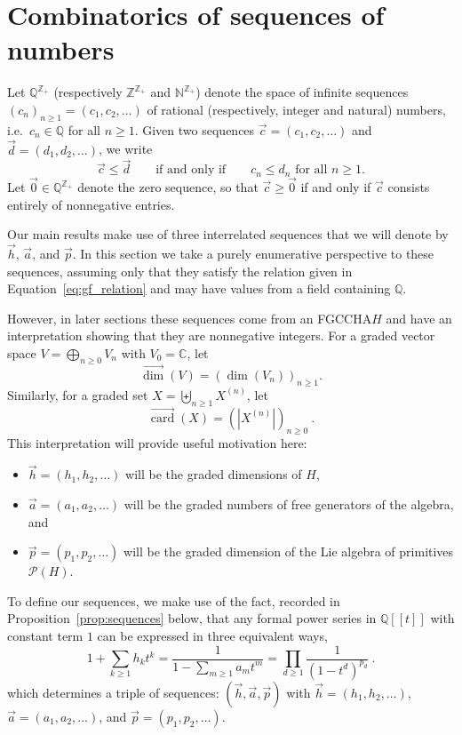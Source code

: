 \documentclass[11pt]{amsart}
\theoremstyle{definition}
\numberwithin{equation}{section}
\def\NN{{\mathbb N}}
\def\CC{{\mathbb C}}
\def\ZZ{{\mathbb Z}}
\def\QQ{{\mathbb Q}}
\newcommand{\FGCCHA}{\textsf{FGCCHA}\xspace}
\newcommand{\vecdim}{\overrightarrow{\dim}}
\newcommand{\veccard}{\overrightarrow{\operatorname{card}}}
\begin{document}
\section{Combinatorics of sequences of numbers}
\label{sec:SequencePrelims}

Let $\QQ^{\ZZ_+}$ (respectively $\ZZ^{\ZZ_+}$ and $\NN^{\ZZ_+}$) denote the space of infinite sequences
$(c_{n})_{n \ge 1} = (c_{1}, c_{2}, \ldots)$ of rational (respectively, integer and natural) numbers,
i.e.~$c_{n} \in \QQ$ for all $n \ge 1$.
Given two sequences $\vec{c} = (c_{1}, c_{2}, \ldots)$ and $\vec{d} = (d_{1}, d_{2}, \ldots)$, we write
\[
\vec{c} \le \vec{d} 
\qquad\text{if and only if}\qquad
\text{$c_{n} \le d_{n}$ for all $n \ge 1$}.
\]
Let $\vec{0} \in \QQ^{\ZZ_+}$ denote the zero sequence, so that $\vec{c} \ge \vec{0}$
if and only if $\vec{c}$ consists entirely of nonnegative entries.

Our main results make use of three interrelated sequences that we will denote by $\vec{h}$, $\vec{a}$, and $\vec{p}$.  
In this section we take a purely enumerative perspective to these sequences, assuming only that they satisfy the relation given in Equation~\eqref{eq:gf_relation} and may have values from a field containing $\QQ$.  

However, in later sections these sequences come from an \FGCCHA $H$
and have an interpretation showing that they are nonnegative integers.
For a graded vector space $V = \bigoplus_{n \ge 0} V_{n}$ with $V_{0} = \CC$, let
\[
\vecdim(V) = \left( \dim(V_{n}) \right)_{n \ge 1}.
\]
Similarly, for a graded set $X = \biguplus_{n \ge 1} X^{(n)}$, let
\[
\veccard(X) = \left( |X^{(n)}| \right)_{n \ge 0}~.
\]
This interpretation will provide useful motivation here:
\begin{itemize}
\item $\vec{h} = (h_{1}, h_{2}, \ldots)$ will be the graded dimensions of $H$,

\item $\vec{a} = (a_{1}, a_{2}, \ldots)$ will be the graded numbers of free generators of the algebra, and 

\item $\vec{p} = (p_{1}, p_{2}, \ldots)$ will be the graded dimension of the Lie algebra of primitives $\mathcal{P}(H)$.

\end{itemize}

To define our sequences, we make use of the fact, recorded in Proposition~\ref{prop:sequences}
below, that any formal power series in $\QQ[\![t]\!]$ with constant term $1$
can be expressed in three equivalent ways,
\begin{equation}
\label{eq:gf_relation}
1 + \sum_{k \geq 1} h_k t^k = \frac{1}{1 - \sum_{m \geq 1} a_m t^m} = \prod_{d \geq 1} \frac{1}{(1-t^d)^{p_d}}~.
\end{equation}
which determines a triple of sequences: $(\vec{h}, \vec{a}, \vec{p})$ with $\vec{h} = (h_{1}, h_{2}, \ldots)$, $\vec{a} = (a_{1}, a_{2}, \ldots)$, and $\vec{p} = (p_{1}, p_{2}, \ldots)$.
\end{document}
